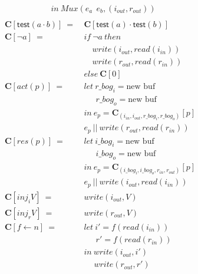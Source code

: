\documentclass[12pt, letterpaper]{article}
\begin{document}
{\begin{align*}
             &in\ Mux(e_a\ \ e_b, (i_{out},r_{out}))\\
    \end{align*}
    \begin{align*}
         \mathbf{C}[\mathsf{test}(a \cdot b)]\ 
            =\ &\mathbf{C}[\mathsf{test}(a) \cdot \mathsf{test}(b)] \\
         \mathbf{C}[\neg a]\ 
            =\ 
            &if\ \neg a\ then\\
            &\quad write(i_{out}, read(i_{in}))\\
            &\quad write(r_{out}, read(r_{in}))\\
            &else\ \mathbf{C}[0]\\
         \mathbf{C}[act(p)]\ 
             =\ &
             let\ r\_bog_i = \text{new buf}\\
             &\quad\ \ r\_bog_o = \text{new buf}\\
             &in\ e_p = \mathbf{C}_{(i_{in}, i_{out}, r\_bog_i, r\_bog_o)}[p]\\
             &e_p\ ||\ write(r_{out}, read(r_{in}))
             \\
         \mathbf{C}[res(p)]\ 
             =\ &
             let\ i\_bog_i = \text{new buf}\\
             &\quad\ \ i\_bog_o = \text{new buf}\\
             &in\ e_p = \mathbf{C}_{(i\_bog_i, i\_bog_o, r_{in}, r_{out})}[p]\\
             &e_p\ ||\ write(i_{out}, read(i_{in}))
             \\
         \mathbf{C}[inj_iV]\ 
             =\ &
             write(i_{out}, V)
             \\
         \mathbf{C}[inj_rV]\ 
             =\ &
             write(r_{out}, V)
             \\
         \mathbf{C}[f \leftarrow n]\ 
             =\ &
             let\ i' = f(read(i_{in}))\\
             &\quad\ \ r' = f(read(r_{in}))\\
             &in\ write(i_{out}, i')\\
             &\quad \ write(r_{out}, r')
             \\

\end{align*}}
\end{document}
